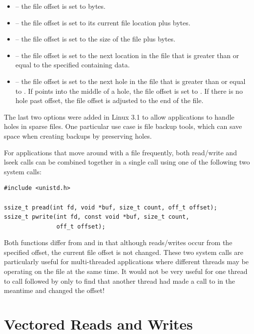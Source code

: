 \begin{itemize}
	\item {} -- the file offset is set to  bytes.
	\item {} -- the file offset is set to its current file location plus  bytes.
	\item {} -- the file offset is set to the size of the file plus  bytes.
	\item {} -- the file offset is set to the next location in the file that is greater than or equal to the
		specified  containing data.
	\item {} -- the file offset is set to the next hole in the file that is greater than or equal to . 
		If  points into the middle of a hole, the file offset is set to .  If there is no hole past
		offset, the file offset is adjusted to the end of the file.
\end{itemize}

\noindent
The last two options were added in Linux 3.1 to allow applications to handle holes in sparse files. One particular use case is file  backup tools, which can save space when creating backups by preserving holes. 

For applications that move around with a file frequently, both read/write and lseek calls can be combined together in a single call using one of the following two system calls:

\begin{lstlisting}
#include <unistd.h>

ssize_t pread(int fd, void *buf, size_t count, off_t offset);
ssize_t pwrite(int fd, const void *buf, size_t count, 
               off_t offset);
\end{lstlisting}

\noindent
Both functions differ from  and  in that although reads/writes occur from the specified offset, the current file offset is not changed. These two system calls are particularly useful for multi-threaded applications where different threads may be operating on the file at the same time. It would not be very useful for one thread to call  followed by  only to find that another thread had made a call to  in the meantime and changed the offset!


\section{Vectored Reads and Writes}

